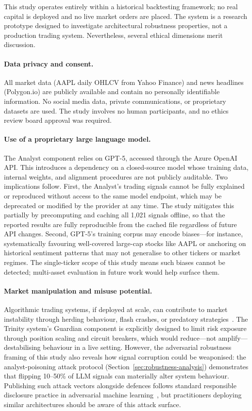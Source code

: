 This study operates entirely within a historical backtesting framework; no real
capital is deployed and no live market orders are placed. The system is a research
prototype designed to investigate architectural robustness properties, not a
production trading system. Nevertheless, several ethical dimensions merit
discussion.

\paragraph{Data privacy and consent.}
All market data (AAPL daily OHLCV from Yahoo Finance) and news headlines
(Polygon.io) are publicly available and contain no personally identifiable
information. No social media data, private communications, or proprietary
datasets are used. The study involves no human participants, and no ethics
review board approval was required.

\paragraph{Use of a proprietary large language model.}
The Analyst component relies on GPT-5, accessed through the Azure OpenAI
API. This introduces a dependency on a closed-source model whose training
data, internal weights, and alignment procedures are not publicly auditable.
Two implications follow. First, the Analyst's trading signals cannot be fully
explained or reproduced without access to the same model endpoint, which may
be deprecated or modified by the provider at any time. The study mitigates
this partially by precomputing and caching all 1{,}021 signals offline, so
that the reported results are fully reproducible from the cached file
regardless of future API changes. Second, GPT-5's training corpus may encode
biases---for instance, systematically favouring well-covered large-cap stocks
like AAPL or anchoring on historical sentiment patterns that may not
generalise to other tickers or market regimes. The single-ticker scope of
this study means such biases cannot be detected; multi-asset evaluation in
future work would help surface them.

\paragraph{Market manipulation and misuse potential.}
Algorithmic trading systems, if deployed at scale, can contribute to market
instability through herding behaviour, flash crashes, or predatory
strategies~\citep{kirilenko2017flash}. The Trinity system's Guardian
component is explicitly designed to limit risk exposure through position
scaling and circuit breakers, which would reduce---not amplify---destabilising
behaviour in a live setting. However, the adversarial robustness framing of
this study also reveals how signal corruption could be weaponised: the
analyst-poisoning attack protocol (Section~\ref{sec:robustness-analysis})
demonstrates that flipping 10--50\% of LLM signals can materially alter
system behaviour. Publishing such attack vectors alongside defences follows
standard responsible disclosure practice in adversarial machine
learning~\citep{biggio2018wild}, but practitioners deploying similar
architectures should be aware of this attack surface.

